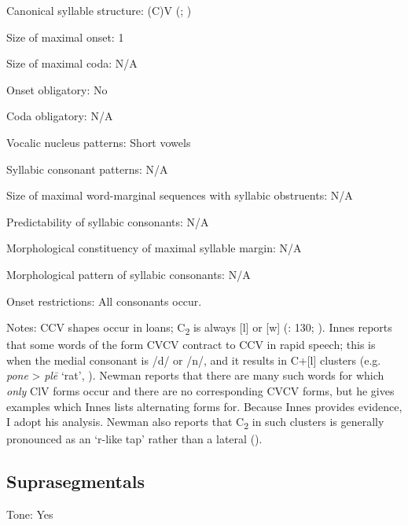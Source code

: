 {\begin{appendixdesc}
\item[Canonical syllable structure:] (C)V (\citealt[130]{Innes1981}; \citeyear[15--16]{Innes1966})

\item[Size of maximal onset:] 1

\item[Size of maximal coda:] N/A

\item[Onset obligatory:] No

\item[Coda obligatory:] N/A

\item[Vocalic nucleus patterns:] Short vowels

\item[Syllabic consonant patterns:] N/A

\item[Size of maximal word-marginal sequences with syllabic obstruents:] N/A

\item[Predictability of syllabic consonants:] N/A

\item[Morphological constituency of maximal syllable margin:] N/A

\item[Morphological pattern of syllabic consonants:] N/A

\item[Onset restrictions:] All consonants occur.

\item[Notes:] CCV shapes occur in loans; C\textsubscript{2} is always [l] or [w] (\citealt{Innes1981}: 130; \citeyear[15--16]{Innes1966}). Innes reports that some words of the form CVCV contract to CCV in rapid speech; this is when the medial consonant is /d/ or /n/, and it results in C+[l] clusters (e.g. \textit{pone} > \textit{plē} ‘rat’, \citeyear[130]{Innes1981}). Newman reports that there are many such words for which \textit{only} ClV forms occur and there are no corresponding CVCV forms, but he gives examples which Innes lists alternating forms for. Because Innes provides evidence, I adopt his analysis. Newman also reports that C\textsubscript{2} in such clusters is generally pronounced as an ‘r-like tap’ rather than a lateral (\citeyear[177]{Newman1986}).
\end{appendixdesc}
\subsection*{Suprasegmentals}
\begin{appendixdesc}
\item[Tone:] Yes


\end{appendixdesc}}
